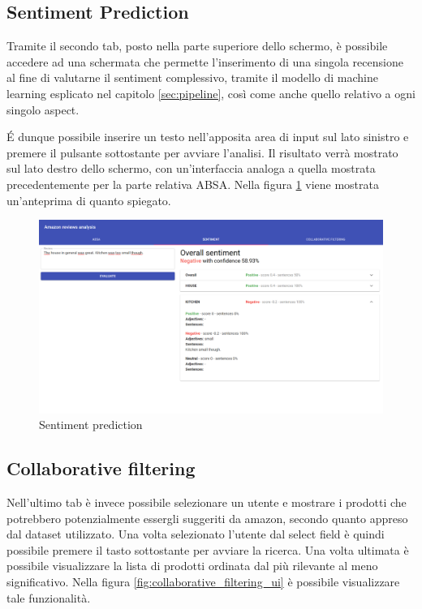 \documentclass[hidelinks, 12pt]{article}
\begin{document}
\subsection{Sentiment Prediction}

Tramite il secondo tab, posto nella parte superiore dello schermo, è possibile accedere ad una schermata che permette l'inserimento di una singola recensione al fine di valutarne il sentiment complessivo, tramite il modello di machine learning esplicato nel capitolo \ref{sec:pipeline}, così come anche quello relativo a ogni singolo aspect.

\'E dunque possibile inserire un testo nell'apposita area di input sul lato sinistro e premere il pulsante sottostante per avviare l'analisi. Il risultato verrà mostrato sul lato destro dello schermo, con un'interfaccia analoga a quella mostrata precedentemente per la parte relativa ABSA. Nella figura \ref{fig:sentiment_ui_prediction} viene mostrata un'anteprima di quanto spiegato.

\begin{figure}[H]
	\centering
	\includegraphics[scale=0.3]{images/08_03_sentiment_ui_prediction.png}
	\caption[Sentiment prediction]{Sentiment prediction}
	\label{fig:sentiment_ui_prediction}
\end{figure}

\subsection{Collaborative filtering}

Nell'ultimo tab è invece possibile selezionare un utente e mostrare i prodotti che potrebbero potenzialmente essergli suggeriti da amazon, secondo quanto appreso dal dataset utilizzato. Una volta selezionato l'utente dal select field è quindi possibile premere il tasto sottostante per avviare la ricerca. Una volta ultimata è possibile visualizzare la lista di prodotti ordinata dal più rilevante al meno significativo. Nella figura \ref{fig:collaborative_filtering_ui} è possibile visualizzare tale funzionalità.
\end{document}

